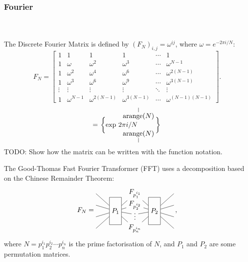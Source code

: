 \subsubsection{Fourier}

\\
\\
The Discrete Fourier Matrix is defined by $(F_N)_{i,j}=\omega^{ij}$,
where $\omega = e^{-2\pi i/N}$:
\[
   \renewcommand*{\arraystretch}{1}
F_N =
   \begin{bmatrix}
      1&1&1&1&\cdots &1 \\
      1&\omega&\omega^2&\omega^3&\cdots&\omega^{N-1} \\
      1&\omega^2&\omega^4&\omega^6&\cdots&\omega^{2(N-1)}\\ 1&\omega^3&\omega^6&\omega^9&\cdots&\omega^{3(N-1)}\\
      \vdots&\vdots&\vdots&\vdots&\ddots&\vdots\\
      1&\omega^{N-1}&\omega^{2(N-1)}&\omega^{3(N-1)}&\cdots&\omega^{(N-1)(N-1)}
   \end{bmatrix}
.
\]
\[
   =
   \begin{tikzpicture}[baseline=-.25em, y=1.3em, inner sep=1pt]
      \node at (0,0) {$\bigg\{\mathrm{exp} \,\, 2\pi i/N$};
      \node (a) at (1,1) {$\mathrm{arange}(N)$};
      \node (b) at (1,-1) {$\mathrm{arange}(N)$};
      \node at (2,0) {$\bigg\}$};
      \draw (a.north) -- ++(0, .5);
      \draw (b.south) -- ++(0, -.5);
   \end{tikzpicture}
\]
TODO: Show how the matrix can be written with the function notation.

The Good-Thomas Fast Fourier Transformer (FFT) uses a decomposition based on the Chinese Remainder Theorem:
\[
F_{N} = 
   \begin{tikzpicture}[baseline=-1em, y=1.7em]
      \node[rectangle, draw, minimum height=4em] (P1) at (0,-.5) {$P_1$};
      \node (A) at (1,1) {$F_{p_1^{i_1}}$};
      \node[rectangle, draw, minimum height=4em] (P2) at (2,-.5) {$P_2$};
      \node (B) at (1,0) {$F_{p_2^{i_2}}$};
      \node (C) at (1,-.8) {$\vdots$};
      \node (D) at (1,-2) {$F_{p_n^{i_n}}$};
      \draw (-1,1) -- (P1) -- (A) -- (P2) -- (3, 1);
      \draw (-1,0) -- (P1) -- (B) -- (P2) -- (3, 0);
      \draw (-1,-1) -- (P1) -- (C) -- (P2) -- (3, -1);
      \draw (-1,-2) -- (P1) -- (D) -- (P2) -- (3, -2);
   \end{tikzpicture}
   \,,
\]
where $N = p_1^{i_1} p_2^{i_2} \cdots p_n^{i_n}$ is the prime factorisation of $N$, and $P_1$ and $P_2$ are some permutation matrices.

